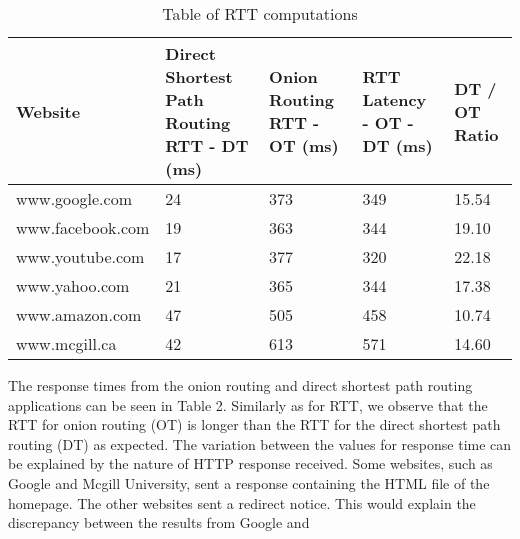 \documentclass{article}
\begin{document}
\begin{table}[]
\centering
\caption{Table of RTT computations}
\label{my-label}
\begin{tabular}{|K{3cm}|K{3cm}|K{2.5cm}|K{2.5cm}|K{1.5cm}|}
\hline
Website          & Direct Shortest Path Routing  RTT - DT (ms) & Onion Routing RTT - OT (ms) & RTT Latency - OT - DT (ms) & DT / OT Ratio  \\ \hline
www.google.com   & 24                                       & 373                           & 349                         & 15.54                    \\ \hline
www.facebook.com & 19                                       & 363                           & 344                         & 19.10                    \\ \hline
www.youtube.com  & 17                                       & 377                           & 320                         & 22.18                    \\ \hline
www.yahoo.com    & 21                                       & 365                           & 344                         & 17.38                    \\ \hline
www.amazon.com   & 47                                       & 505                           & 458                         & 10.74                    \\ \hline
www.mcgill.ca    & 42                                       & 613                           & 571                         & 14.60                    \\ \hline
\end{tabular}
\end{table}
\vspace{0.3 cm}

\noindent The response times from the onion routing and direct shortest path routing applications can be seen in Table 2. Similarly as for RTT, we observe that the RTT for onion routing (OT) is longer than the RTT for the direct shortest path routing (DT) as expected. The variation between the values for response time can be explained by the nature of HTTP response received. Some websites, such as Google and Mcgill University, sent a response containing the HTML file of the homepage. The other websites sent a redirect notice. This would explain the discrepancy between the results from Google and 
\end{document}
